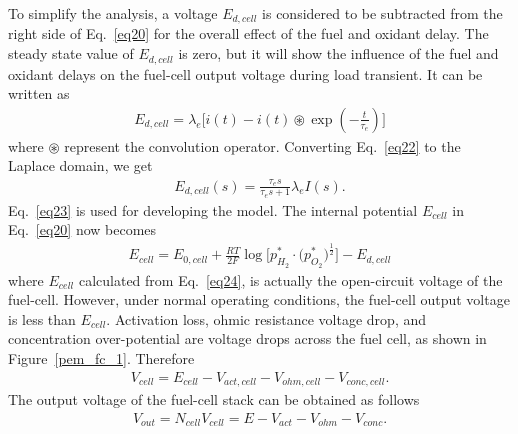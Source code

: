\documentclass[12pt,a4paper]{scrartcl}
\begin{document}
\begin{onehalfspace}
To simplify the analysis, a voltage $E_{d,cell}$ is considered to be subtracted  from the right side of Eq.~\eqref{eq20} for the overall effect of the fuel and oxidant delay. The steady state value of $E_{d,cell}$ is zero, but it will show the influence of the fuel and oxidant delays on the fuel-cell output voltage during load transient. It can be written as
\begin{equation}\label{eq22}
	\begin{aligned}
		E_{d,cell} = \lambda_e \Big[i(t) - i(t)\circledast\exp(-\frac{t}{\tau_e})\Big]
	\end{aligned}
\end{equation}
where $\circledast$ represent the convolution operator. Converting Eq.~\eqref{eq22} to the Laplace domain, we get
\begin{equation}\label{eq23}
	\begin{aligned}
		E_{d,cell}(s) = \frac{\tau_es}{\tau_es+1} \lambda_eI(s).
	\end{aligned}
\end{equation}
Eq.~\eqref{eq23} is used for developing the model. The internal potential $E_{cell}$ in Eq.~\eqref{eq20} now becomes
\begin{equation}\label{eq24}
	\begin{aligned}
		E_{cell} = E_{0,cell} + \frac{RT}{2F}\log\Bigg[{p_{H_2}^*\cdot\Big(p_{O_2}^*\Big)^{\frac{1}{2}}}\Bigg]-E_{d,cell}
	\end{aligned}
\end{equation}
where $E_{cell}$ calculated from Eq.~\eqref{eq24}, is actually the open-circuit voltage of the fuel-cell. However, under normal operating conditions, the fuel-cell output voltage is less than $E_{cell}$. Activation loss, ohmic resistance voltage drop, and concentration over-potential are voltage drops across the fuel cell, as shown in Figure~\ref{pem_fc_1}. Therefore
\begin{equation}\label{eq25}
	\begin{aligned}
		V_{cell} = E_{cell} - V_{act,cell} - V_{ohm,cell} - V_{conc,cell}.
	\end{aligned}
\end{equation}
The output voltage of the fuel-cell stack can be obtained as follows
\begin{equation}\label{eq26}
	\begin{aligned}
		V_{out} = N_{cell}V_{cell} = E - V_{act} - V_{ohm} - V_{conc}.
	\end{aligned}
\end{equation}

\end{onehalfspace}
\end{document}
